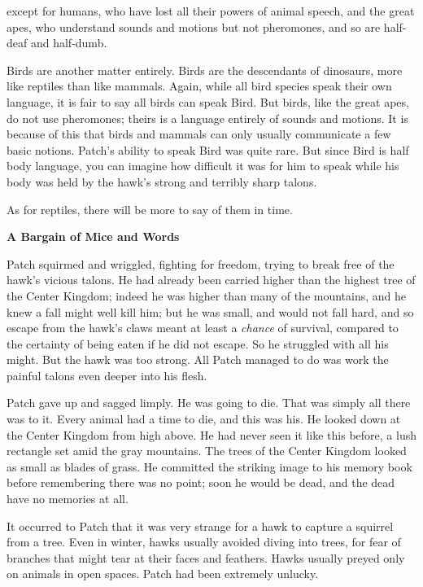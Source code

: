 \documentclass[11pt]{article}
\begin{document}
 except for humans, who have lost all their powers of animal speech, and the great apes, who understand sounds and motions but not pheromones, and so are half-deaf and half-dumb.\par
 Birds are another matter entirely. Birds are the descendants of dinosaurs, more like reptiles than like mammals. Again, while all bird species speak their own language, it is fair to say all birds can speak Bird. But birds, like the great apes, do not use pheromones; theirs is a language entirely of sounds and motions. It is because of this that birds and mammals can only usually communicate a few basic notions. Patch's ability to speak Bird was quite rare. But since Bird is half body language, you can imagine how difficult it was for him to speak while his body was held by the hawk's strong and terribly sharp talons.\par
 As for reptiles, there will be more to say of them in time.\par
\par
{\bf A Bargain of Mice and Words\par
}\par
 Patch squirmed and wriggled, fighting for freedom, trying to break free of the hawk's vicious talons. He had already been carried higher than the highest tree of the Center Kingdom; indeed he was higher than many of the mountains, and he knew a fall might well kill him; but he was small, and would not fall hard, and so escape from the hawk's claws meant at least a {\it chance} of survival, compared to the certainty of being eaten if he did not escape. So he struggled with all his might. But the hawk was too strong. All Patch managed to do was work the painful talons even deeper into his flesh.\par
 Patch gave up and sagged limply. He was going to die. That was simply all there was to it. Every animal had a time to die, and this was his. He looked down at the Center Kingdom from high above. He had never seen it like this before, a lush rectangle set amid the gray mountains. The trees of the Center Kingdom looked as small as blades of grass. He committed the striking image to his memory book before remembering there was no point; soon he would be dead, and the dead have no memories at all.\par
 It occurred to Patch that it was very strange for a hawk to capture a squirrel from a tree. Even in winter, hawks usually avoided diving into trees, for fear of branches that might tear at their faces and feathers. Hawks usually preyed only on animals in open spaces. Patch had been extremely unlucky.\par
\end{document}

